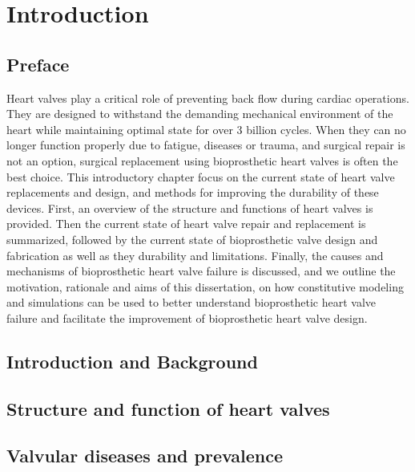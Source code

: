 \chapter{Introduction} %

\section*{Preface}
%

    Heart valves play a critical role of preventing back flow during cardiac operations. They are designed to withstand the demanding mechanical environment of the heart while maintaining optimal state for over 3 billion cycles. When they can no longer function properly due to fatigue, diseases or trauma, and surgical repair is not an option, surgical replacement using bioprosthetic heart valves is often the best choice. This introductory chapter focus on the current state of heart valve replacements and design, and methods for improving the durability of these devices. First, an overview of the structure and functions of heart valves is provided. Then the current state of heart valve repair and replacement is summarized, followed by the current state of bioprosthetic valve design and fabrication as well as they durability and limitations. Finally, the causes and mechanisms of bioprosthetic heart valve failure is discussed, and we outline the motivation, rationale and aims of this dissertation, on how constitutive modeling and simulations can be used to better understand bioprosthetic heart valve failure and facilitate the improvement of bioprosthetic heart valve design. 

\section{Introduction and Background}


\section{Structure and function of heart valves}


\section{Valvular diseases and prevalence}


